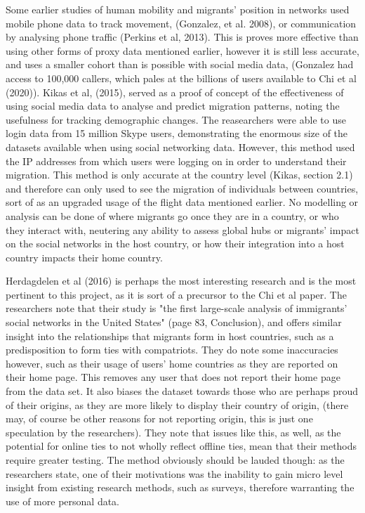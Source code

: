 \documentclass[12pt]{article}
\begin{document}
Some earlier studies of human mobility and migrants' position in networks used mobile phone data to 
track movement, (Gonzalez, et al. 2008), or communication by analysing phone traffic (Perkins et al, 2013).
This is proves more effective than using other forms of proxy data mentioned earlier,  
however it is still less accurate, and uses a smaller cohort than is possible with social media 
data, (Gonzalez had access to 100,000 callers, which pales at the billions of users available to Chi et al (2020)). 
Kikas et al, (2015), served as a proof of concept of the effectiveness of using social 
media data to analyse and predict migration patterns, noting the usefulness for tracking 
demographic changes. The reasearchers were able to use login data from 15 million 
Skype users, demonstrating the enormous size of the datasets available when using social 
networking data. However, this method used the IP addresses from which users were logging 
on in order to understand their migration. This method is only accurate at the country 
level (Kikas, section 2.1)
and therefore can only used to see the migration of individuals between countries,
sort of as an upgraded usage of the flight data mentioned earlier. No modelling or 
analysis can be done of where migrants go once they are in a country, or who they interact 
with, neutering any ability to assess global hubs or migrants' impact on the social 
networks in the host country, or how their integration into a host country impacts their 
home country.

Herdagdelen et al (2016) is perhaps the most interesting research and is the most 
pertinent to this project, as it is sort of a precursor to the Chi et al paper. The researchers 
note that their study is "the first large-scale analysis of immigrants’ social networks in the 
United States" (page 83, Conclusion),
and offers similar insight into the relationships that migrants form in host countries, such 
as a predisposition to form ties with compatriots. They do note some inaccuracies however, 
such as their usage of users' home countries as they are reported on their home page. This 
removes any user that does not report their home page from the data set. It also biases 
the dataset towards those who are perhaps proud of their origins, as they are more likely 
to display their country of origin, (there may, of course be other reasons for not reporting 
origin, this is just one speculation by the researchers). They note that issues like this, 
as well, as the potential for online ties to not wholly reflect offline ties, mean that 
their methods require greater testing. The method obviously should be lauded though: as 
the researchers state, one of their motivations was the inability to gain micro level insight
from existing research methods, such as surveys, therefore warranting the use of more 
personal data. 
\end{document}
